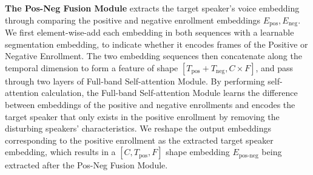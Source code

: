 \textbf{The Pos-Neg Fusion Module} extracts the target speaker's voice embedding through comparing the positive and negative enrollment embeddings $E_{\text{pos}}, E_{\text{neg}}$. We first element-wise-add each embedding in both sequences with a learnable segmentation embedding, to indicate whether it encodes frames of the Positive or Negative Enrollment. The two embedding sequences then concatenate along the temporal dimension to form a feature of shape $[T_{\text{pos}} + T_{\text{neg}}, C \times F]$, and pass through two layers of Full-band Self-attention Module. By performing self-attention calculation, the Full-band Self-attention Module learns the difference between embeddings of the positive and negative enrollments and encodes the target speaker that only exists in the positive enrollment by removing the disturbing speakers' characteristics. We reshape the output embeddings corresponding to the positive enrollment as the extracted target speaker embedding, which results in a $[C, T_{\text{pos}}, F]$ shape embedding $E_{\text{pos-neg}}$ being extracted after the Pos-Neg Fusion Module. 




